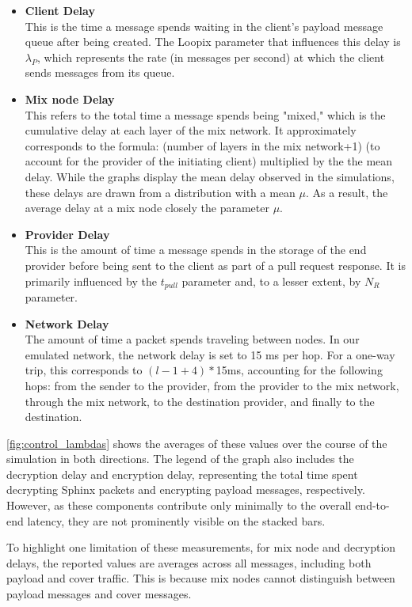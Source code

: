 \documentclass[a4paper,11pt,oneside]{report}
\begin{document}
\begin{itemize}
    \item \textbf{Client Delay} \\
    This is the time a message spends waiting in the client’s payload message queue after being created. The Loopix parameter that influences this delay is \(\lambda_P\), which represents the rate (in messages per second) at which the client sends messages from its queue.
    \item \textbf{Mix node Delay} \\
    This refers to the total time a message spends being "mixed," which is the cumulative delay at each layer of the mix network. It approximately corresponds to the formula: (number of layers in the mix network+1) (to account for the provider of the initiating client) multiplied by the the mean delay.  While the graphs display the mean delay observed in the simulations, these delays are drawn from a distribution with a mean \(\mu\). As a result, the average delay at a mix node closely the parameter \(\mu\).
    \item \textbf{Provider Delay} \\
    This is the amount of time a message spends in the storage of the end provider before being sent to the client as part of a pull request response. It is primarily influenced by the \(t_{pull}\) parameter and, to a lesser extent, by \(N_R\) parameter.
    \item \textbf{Network Delay} \\
    The amount of time a packet spends traveling between nodes. In our emulated network, the network delay is set to 15 ms per hop. For a one-way trip, this corresponds to \((l - 1 + 4)*\)15ms, accounting for the following hops: from the sender to the provider, from the provider to the mix network, through the mix network, to the destination provider, and finally to the destination.
\end{itemize}

\autoref{fig:control_lambdas} shows the averages of these values over the course of the simulation in both directions. The legend of the graph also includes the decryption delay and encryption delay, representing the total time spent decrypting Sphinx packets and encrypting payload messages, respectively. However, as these components contribute only minimally to the overall end-to-end latency, they are not prominently visible on the stacked bars.

To highlight one limitation of these measurements, for mix node and decryption delays, the reported values are averages across all messages, including both payload and cover traffic. This is because mix nodes cannot distinguish between payload messages and cover messages.
\end{document}
